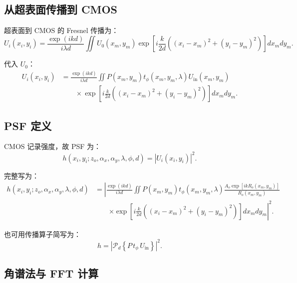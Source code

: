 \documentclass[11pt,a4paper,fontset=none]{ctexart}
\begin{document}
\subsection{从超表面传播到 CMOS}

超表面到 CMOS 的 Fresnel 传播为：
\begin{equation}
  U_i(x_i,y_i)
  =
  \frac{\exp(ikd)}{i\lambda d}
  \iint
  U_0(x_m,y_m)
  \exp
  \left[
  i\frac{k}{2d}
  \left(
  (x_i-x_m)^2+
  (y_i-y_m)^2
  \right)
  \right]
  dx_mdy_m.
\end{equation}

代入 $U_0$：
\begin{equation}
\begin{aligned}
  U_i(x_i,y_i)
  &=
  \frac{\exp(ikd)}{i\lambda d}
  \iint
  P(x_m,y_m)t_\phi(x_m,y_m,\lambda)
  U_{\mathrm{in}}(x_m,y_m)\\
  &\qquad\times
  \exp
  \left[
  i\frac{k}{2d}
  \left(
  (x_i-x_m)^2+
  (y_i-y_m)^2
  \right)
  \right]
  dx_mdy_m.
\end{aligned}
\end{equation}

\subsection{PSF 定义}

CMOS 记录强度，故 PSF 为：
\begin{equation}
  h(x_i,y_i;z_o,\alpha_x,\alpha_y,\lambda,\phi,d)
  =
  |U_i(x_i,y_i)|^2.
\end{equation}

完整写为：
\begin{equation}
\begin{aligned}
  h(x_i,y_i;z_o,\alpha_x,\alpha_y,\lambda,\phi,d)
  &=
  \left|
  \frac{\exp(ikd)}{i\lambda d}
  \iint
  P(x_m,y_m)t_\phi(x_m,y_m,\lambda)
  \frac{A_o\exp[i k R_o(x_m,y_m)]}{R_o(x_m,y_m)}
  \right.\\
  &\qquad\left.
  \times
  \exp
  \left[
  i\frac{k}{2d}
  \left(
  (x_i-x_m)^2+
  (y_i-y_m)^2
  \right)
  \right]
  dx_mdy_m
  \right|^2 .
\end{aligned}
\end{equation}

也可用传播算子简写为：
\begin{equation}
  h=
  \left|
  \mathcal P_d
  \left\{
  P\,t_\phi\,U_{\mathrm{in}}
  \right\}
  \right|^2.
\end{equation}

\subsection{角谱法与 FFT 计算}
\end{document}
